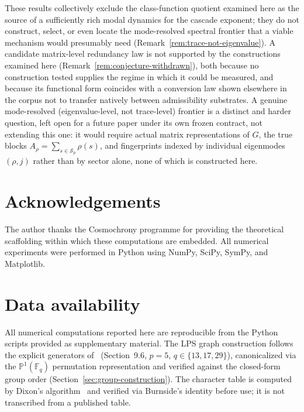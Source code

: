 \documentclass[11pt,a4paper]{article}
\theoremstyle{plain}
\theoremstyle{definition}
\theoremstyle{remark}
\newcommand{\F}{\mathbb{F}}
\begin{document}
        These results collectively exclude the class-function quotient examined here as the source of
        a sufficiently rich modal dynamics for the cascade exponent; they do not construct, select, or
        even locate the mode-resolved spectral frontier that a viable mechanism would presumably need
        (Remark~\ref{rem:trace-not-eigenvalue}).
        A candidate matrix-level redundancy law is not supported by the constructions examined here
        (Remark~\ref{rem:conjecture-withdrawn}), both because no construction tested supplies the
        regime in which it could be measured, and
        because its functional form coincides with a conversion law shown elsewhere in the corpus
        not to transfer natively between admissibility substrates.
        A genuine mode-resolved (eigenvalue-level, not trace-level) frontier is a distinct and harder
        question, left open for a future paper under its own frozen contract, not extending this one:
        it would require actual matrix representations of $G$, the true blocks
        $A_\rho = \sum_{s\in\mathcal S_p}\rho(s)$, and fingerprints indexed by individual eigenmodes
        $(\rho,j)$ rather than by sector alone, none of which is constructed here.

  \section*{Acknowledgements}


  The author thanks the Cosmochrony programme for providing the theoretical scaffolding
  within which these computations are embedded.
  All numerical experiments were performed in Python using NumPy, SciPy, SymPy, and Matplotlib.

  \section*{Data availability}

  All numerical computations reported here are reproducible from the Python scripts
  provided as supplementary material.
  The LPS graph construction follows the explicit generators of~\cite{Beau2026a1}
  (Section~9.6, $p=5$, $q \in \{13, 17, 29\}$), canonicalized via the $\mathbb{P}^1(\F_q)$ permutation
  representation and verified against the closed-form group order
  (Section~\ref{sec:group-construction}).
  The character table is computed by Dixon's algorithm~\cite{Dixon1967} and verified via Burnside's
  identity before use; it is not transcribed from a published table.

  
      
\end{document}
